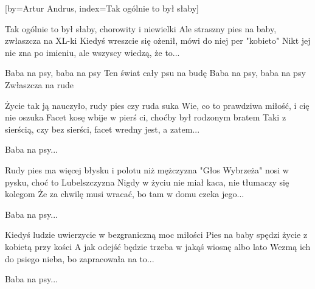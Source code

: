 [by={Artur Andrus},
                     index={Tak ogólnie to był słaby}]
\beginverse

Tak ogólnie to był słaby, chorowity i niewielki
Ale straszny pies na baby, zwłaszcza na XL-ki
Kiedyś wreszcie się ożenił, mówi do niej per "kobieto"
Nikt jej nie zna po imieniu, ale wszyscy wiedzą, że to...

\endverse
\beginverse

Baba na psy, baba na psy
Ten świat cały psu na budę
Baba na psy, baba na psy
Zwłaszcza na rude

\endverse
\beginverse

Życie tak ją nauczyło, rudy pies czy ruda suka
Wie, co to prawdziwa miłość, i cię nie oszuka
Facet kosę wbije w pierś ci, choćby był rodzonym bratem
Taki z sierścią, czy bez sierści, facet wredny jest, a zatem...

\endverse
\beginverse

Baba na psy...

\endverse
\beginverse

Rudy pies ma więcej błysku i polotu niż mężczyzna
"Głos Wybrzeża" nosi w pysku, choć to Lubelszczyzna
Nigdy w życiu nie miał kaca, nie tłumaczy się kolegom
Że za chwilę musi wracać, bo tam w domu czeka jego...

\endverse
\beginverse

Baba na psy...

\endverse
\beginverse

Kiedyś ludzie uwierzycie w bezgraniczną moc miłości
Pies na baby spędzi życie z kobietą przy kości
A jak odejść będzie trzeba w jakąś wiosnę albo lato
Wezmą ich do psiego nieba, bo zapracowała na to...

\endverse
\beginverse

Baba na psy...

\endverse
\beginverse

\endverse
\endsong